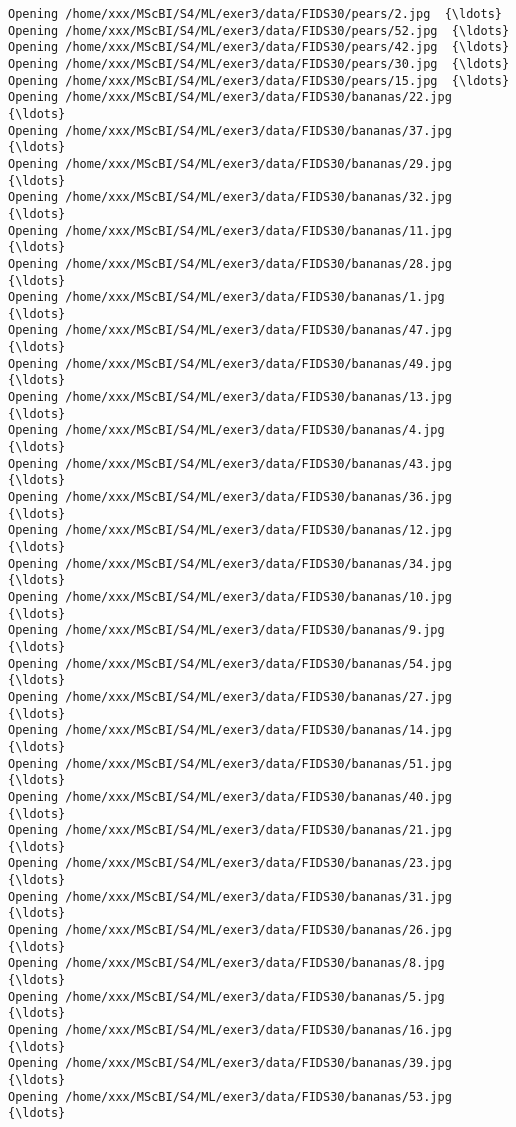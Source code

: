 \documentclass[11pt]{article}
\begin{document}
\begin{Verbatim}[commandchars=\\\{\}]
Opening /home/xxx/MScBI/S4/ML/exer3/data/FIDS30/pears/2.jpg  {\ldots}
Opening /home/xxx/MScBI/S4/ML/exer3/data/FIDS30/pears/52.jpg  {\ldots}
Opening /home/xxx/MScBI/S4/ML/exer3/data/FIDS30/pears/42.jpg  {\ldots}
Opening /home/xxx/MScBI/S4/ML/exer3/data/FIDS30/pears/30.jpg  {\ldots}
Opening /home/xxx/MScBI/S4/ML/exer3/data/FIDS30/pears/15.jpg  {\ldots}
Opening /home/xxx/MScBI/S4/ML/exer3/data/FIDS30/bananas/22.jpg  {\ldots}
Opening /home/xxx/MScBI/S4/ML/exer3/data/FIDS30/bananas/37.jpg  {\ldots}
Opening /home/xxx/MScBI/S4/ML/exer3/data/FIDS30/bananas/29.jpg  {\ldots}
Opening /home/xxx/MScBI/S4/ML/exer3/data/FIDS30/bananas/32.jpg  {\ldots}
Opening /home/xxx/MScBI/S4/ML/exer3/data/FIDS30/bananas/11.jpg  {\ldots}
Opening /home/xxx/MScBI/S4/ML/exer3/data/FIDS30/bananas/28.jpg  {\ldots}
Opening /home/xxx/MScBI/S4/ML/exer3/data/FIDS30/bananas/1.jpg  {\ldots}
Opening /home/xxx/MScBI/S4/ML/exer3/data/FIDS30/bananas/47.jpg  {\ldots}
Opening /home/xxx/MScBI/S4/ML/exer3/data/FIDS30/bananas/49.jpg  {\ldots}
Opening /home/xxx/MScBI/S4/ML/exer3/data/FIDS30/bananas/13.jpg  {\ldots}
Opening /home/xxx/MScBI/S4/ML/exer3/data/FIDS30/bananas/4.jpg  {\ldots}
Opening /home/xxx/MScBI/S4/ML/exer3/data/FIDS30/bananas/43.jpg  {\ldots}
Opening /home/xxx/MScBI/S4/ML/exer3/data/FIDS30/bananas/36.jpg  {\ldots}
Opening /home/xxx/MScBI/S4/ML/exer3/data/FIDS30/bananas/12.jpg  {\ldots}
Opening /home/xxx/MScBI/S4/ML/exer3/data/FIDS30/bananas/34.jpg  {\ldots}
Opening /home/xxx/MScBI/S4/ML/exer3/data/FIDS30/bananas/10.jpg  {\ldots}
Opening /home/xxx/MScBI/S4/ML/exer3/data/FIDS30/bananas/9.jpg  {\ldots}
Opening /home/xxx/MScBI/S4/ML/exer3/data/FIDS30/bananas/54.jpg  {\ldots}
Opening /home/xxx/MScBI/S4/ML/exer3/data/FIDS30/bananas/27.jpg  {\ldots}
Opening /home/xxx/MScBI/S4/ML/exer3/data/FIDS30/bananas/14.jpg  {\ldots}
Opening /home/xxx/MScBI/S4/ML/exer3/data/FIDS30/bananas/51.jpg  {\ldots}
Opening /home/xxx/MScBI/S4/ML/exer3/data/FIDS30/bananas/40.jpg  {\ldots}
Opening /home/xxx/MScBI/S4/ML/exer3/data/FIDS30/bananas/21.jpg  {\ldots}
Opening /home/xxx/MScBI/S4/ML/exer3/data/FIDS30/bananas/23.jpg  {\ldots}
Opening /home/xxx/MScBI/S4/ML/exer3/data/FIDS30/bananas/31.jpg  {\ldots}
Opening /home/xxx/MScBI/S4/ML/exer3/data/FIDS30/bananas/26.jpg  {\ldots}
Opening /home/xxx/MScBI/S4/ML/exer3/data/FIDS30/bananas/8.jpg  {\ldots}
Opening /home/xxx/MScBI/S4/ML/exer3/data/FIDS30/bananas/5.jpg  {\ldots}
Opening /home/xxx/MScBI/S4/ML/exer3/data/FIDS30/bananas/16.jpg  {\ldots}
Opening /home/xxx/MScBI/S4/ML/exer3/data/FIDS30/bananas/39.jpg  {\ldots}
Opening /home/xxx/MScBI/S4/ML/exer3/data/FIDS30/bananas/53.jpg  {\ldots}

\end{Verbatim}
\end{document}
